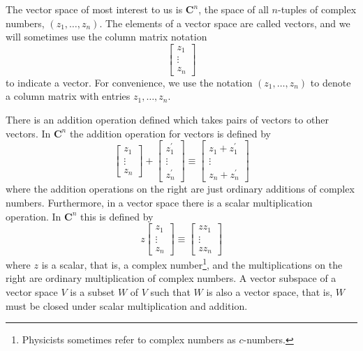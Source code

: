 The vector space of most interest to us is $\mathbf{C}^{n}$, the space of all $n$-tuples of complex numbers, $\left(z_{1}, \ldots, z_{n}\right)$. The elements of a vector space are called vectors, and we will sometimes use the column matrix notation
$$
\left[\begin{array}{c}
z_{1} \\
\vdots \\
z_{n}
\end{array}\right]
$$
to indicate a vector. For convenience, we use the notation $\left(z_{1}, \ldots, z_{n}\right)$ to denote a column matrix with entries $z_{1}, \ldots, z_{n}$. 

There is an addition operation defined which takes pairs of vectors to other vectors. In $\mathbf{C}^{n}$ the addition operation for vectors is defined by
$$
\left[\begin{array}{c}
z_{1} \\
\vdots \\
z_{n}
\end{array}\right]+\left[\begin{array}{c}
z_{1}^{\prime} \\
\vdots \\
z_{n}^{\prime}
\end{array}\right] \equiv\left[\begin{array}{c}
z_{1}+z_{1}^{\prime} \\
\vdots \\
z_{n}+z_{n}^{\prime}
\end{array}\right]
$$
where the addition operations on the right are just ordinary additions of complex numbers. Furthermore, in a vector space there is a scalar multiplication operation. In $\mathbf{C}^{n}$ this is defined by
$$
z\left[\begin{array}{c}
z_{1} \\
\vdots \\
z_{n}
\end{array}\right] \equiv\left[\begin{array}{c}
z z_{1} \\
\vdots \\
z z_{n}
\end{array}\right]
$$
where $z$ is a scalar, that is, a complex number\footnote{Physicists sometimes refer to complex numbers as $c$-numbers.}, and the multiplications on the right are ordinary multiplication of complex numbers. A vector subspace of a vector space $V$ is a subset $W$ of $V$ such that $W$ is also a vector space, that is, $W$ must be closed under scalar multiplication and addition.


